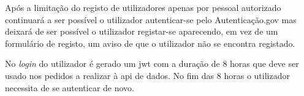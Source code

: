 Após a limitação do registo de utilizadores apenas por pessoal autorizado continuará a ser possível o utilizador autenticar-se pelo Autenticação.gov mas deixará de ser possível o utilizador registar-se aparecendo, em vez de um formulário de registo, um aviso de que o utilizador não se encontra registado.

No \textit{login} do utilizador é gerado um \acrshort{jwt} com a duração de 8 horas que deve ser usado nos pedidos a realizar à \acrshort{api} de dados. No fim das 8 horas o utilizador necessita de se autenticar de novo.
